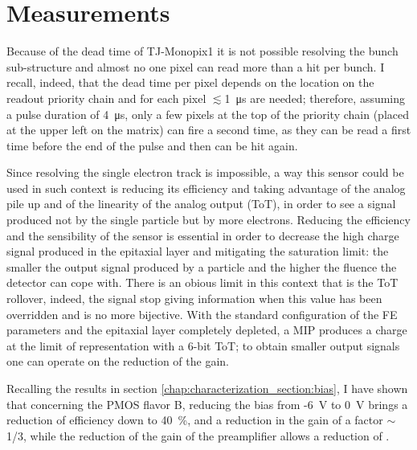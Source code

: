 \section{Measurements}\label{sec:Santa_chiara_measurement}
   Because of the dead time of TJ-Monopix1 it is not possible resolving the bunch sub-structure and almost no one pixel can read more than a hit per bunch. I recall, indeed, that the dead time per pixel depends on the location on the readout priority chain and for each pixel $\lesssim$\SI{1}{\us} are needed; therefore, assuming a pulse duration of \SI{4}{\us}, only a few pixels at the top of the priority chain (placed at the upper left on the matrix) can fire a second time, as they can be read a first time before the end of the pulse and then can be hit again.

   Since resolving the single electron track is impossible, a way this sensor could be used in such context is reducing its efficiency and taking advantage of the analog pile up and of the linearity of the analog output (ToT), in order to see a signal produced not by the single particle but by more electrons. 
   Reducing the efficiency and the sensibility of the sensor is essential in order to decrease the high charge signal produced in the epitaxial layer and mitigating the saturation limit: the smaller the output signal produced by a particle and the higher the fluence the detector can cope with.
   There is an obious limit in this context that is the ToT rollover, indeed, the signal stop giving information when this value has been overridden and is no more bijective.
   With the standard configuration of the FE parameters and the epitaxial layer completely depleted, a MIP produces a charge at the limit of representation with a 6-bit ToT; to obtain smaller output signals one can operate on the reduction of the gain.

   Recalling the results in section \ref{chap:characterization_section:bias}, I have shown that concerning the PMOS flavor B, reducing the bias from -\SI{6}{V} to \SI{0}{V} brings a reduction of efficiency down to \SI{40}{\%}, and a reduction in the gain of a factor $\sim$1/3, while the reduction of the gain of the preamplifier allows a reduction of .
   
